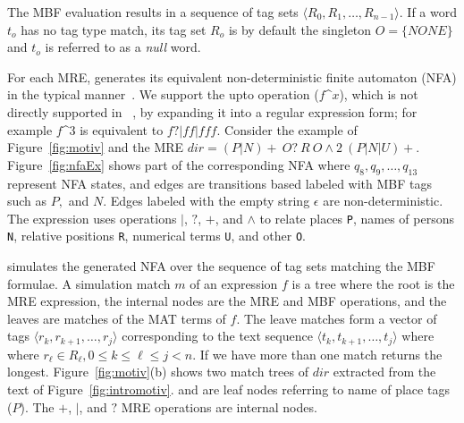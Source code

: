 The MBF evaluation results in a sequence of tag sets 
$\langle R_0, R_1, \ldots, R_{n-1}\rangle$.
If a word $t_o$ has no tag type match, 
its tag set $R_o$ is by default the singleton $O=\{\mathit{NONE}\}$
and $t_o$ is referred to as a {\em null} word.


For each MRE, 
\framework generates its equivalent non-deterministic finite automaton (NFA) 
in the typical manner~\cite{sipser2006introduction}. 
We support the upto operation ($f$\textasciicircum$x$), which is not directly 
supported in ~\cite{sipser2006introduction}, by 
expanding it into a regular expression form; for example 
$f$\textasciicircum$3$ is equivalent to $f?|ff|fff$. 
Consider the example of Figure~\ref{fig:motiv} and the
MRE $\mathit{dir}= (P|N)+~O?~R~O\wedge 2~(P|N|U)+$. 
Figure~\ref{fig:nfaEx} shows part of the corresponding NFA where
$q_8, q_9, \dots, q_{13}$ represent NFA states,
and edges are transitions based labeled with MBF tags such as 
$P,$ and $N$. Edges labeled with the 
empty string $\epsilon$ are non-deterministic.
The expression uses operations $|$, $?$, $+$, and $\wedge$ to 
relate places {\tt P}, names of persons {\tt N}, 
relative positions {\tt R}, numerical terms {\tt U}, and other {\tt O}.

\framework simulates the generated NFA over the sequence of tag sets 
matching the MBF formulae.
A simulation match $m$ of an expression $f$ is a tree where the root is the 
MRE expression, the internal nodes are the MRE and MBF operations, and the 
leaves are matches of the MAT terms of $f$.
The leave matches form a vector of tags
$\langle r_k,r_{k+1},\dots,r_j\rangle$ 
corresponding to the text sequence 
$\langle t_k,t_{k+1},\dots,t_j\rangle$ where 
where $r_{\ell}\in R_{\ell},0\le k\le \ell \le j < n$.
%
%
If we have more than one match %
\framework returns the longest. 
%
Figure~\ref{fig:motiv}(b) shows two match trees of $\mathit{dir}$ extracted 
from the text of Figure~\ref{fig:intromotiv}.
 and  are leaf nodes referring to name of place tags ($P$). 
The $+$, $|$, and $?$ MRE operations
are internal nodes.

